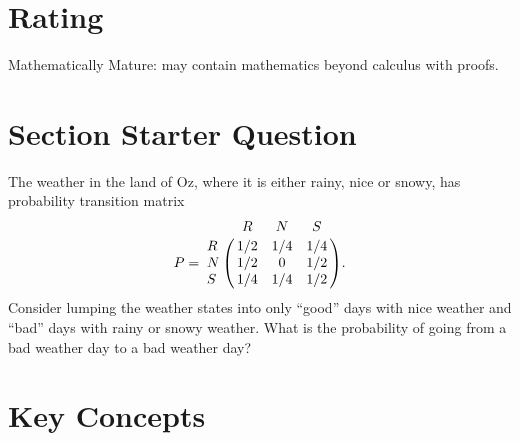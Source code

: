 \documentclass[12pt]{article}
\begin{document}
\myheader \mytitle

\hr


\hr

\usefirefox

\hr



\section*{Rating} %
Mathematically Mature:  may contain mathematics beyond calculus with
proofs.  %

\hr

\section*{Section Starter Question}

The weather in the land of Oz, where it is either rainy, nice or snowy,
has probability transition matrix
\[
    P = \bordermatrix{ & R & N & S \cr
    R & 1/2 & 1/4 & 1/4 \cr
    N & 1/2 & 0 & 1/2 \cr
    S & 1/4 & 1/4 & 1/2 }.
\] Consider lumping the weather states into only ``good'' days with nice
weather and ``bad'' days with rainy or snowy weather.  What is the
probability of going from a bad weather day to a bad weather day?

\hr

\section*{Key Concepts}
\end{document}

